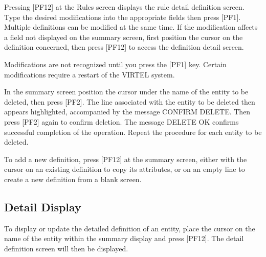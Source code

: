 \documentclass[letterpaper,10pt,english]{sphinxmanual}
\begin{document}
\sphinxAtStartPar
{} \sphinxhyphen{} Pressing {[}PF12{]} at the Rules screen displays the rule detail definition screen. Type the desired modifications into the appropriate fields then press {[}PF1{]}. Multiple definitions can be modified at the same time. If the modification affects a field not displayed on the summary screen, first position the cursor on the definition concerned, then press {[}PF12{]} to access the definition detail screen.
\begin{description}
\sphinxAtStartPar
Modifications are not recognized until you press the {[}PF1{]} key. Certain modifications require a restart of the VIRTEL system.

\end{description}

\sphinxAtStartPar
{} \sphinxhyphen{} In the summary screen position the cursor under the name of the entity to be deleted, then press {[}PF2{]}. The line associated with the entity to be deleted then appears highlighted, accompanied by the message CONFIRM DELETE. Then press {[}PF2{]} again to confirm deletion. The message DELETE OK confirms successful completion of the operation. Repeat the procedure for each entity to be deleted.

\sphinxAtStartPar
{} \sphinxhyphen{} To add a new definition, press {[}PF12{]} at the summary screen, either with the cursor on an existing definition to copy its attributes, or on an empty line to create a new definition from a blank screen.

\ignorespaces 

\subsection{Detail Display}
\label{\detokenize{connectivity_guide:index-95}}\label{\detokenize{connectivity_guide:id48}}
\sphinxAtStartPar
To display or update the detailed definition of an entity, place the cursor on the name of the entity within the summary display and press {[}PF12{]}. The detail definition screen will then be displayed.

\sphinxAtStartPar
{}
\end{document}
